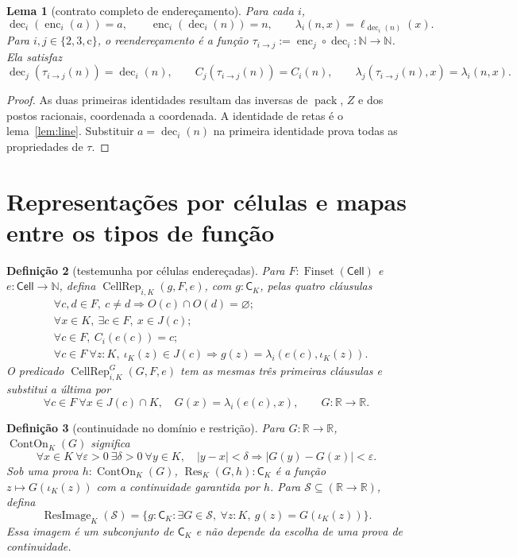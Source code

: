 \documentclass[11pt,a4paper]{article}
\newtheorem{definicao}{Definição}[section]
\newtheorem{lema}[definicao]{Lema}
\newcommand{\N}{\mathbb N}
\newcommand{\R}{\mathbb R}
\newcommand{\Cell}{\mathsf{Cell}}
\newcommand{\CK}{\mathsf C_K}
\newcommand{\FS}{\operatorname{Finset}}
\newcommand{\Res}{\operatorname{Res}}
\newcommand{\ImageRes}{\operatorname{ResImage}}
\newcommand{\dec}{\operatorname{dec}}
\newcommand{\enc}{\operatorname{enc}}
\begin{document}
\begin{lema}[contrato completo de endereçamento]\label{lem:codec}
Para cada $i$,
\[
 \dec_i(\enc_i(a))=a,\qquad \enc_i(\dec_i(n))=n,
 \qquad\lambda_i(n,x)=\ell_{\dec_i(n)}(x).
\]
Para $i,j\in\{2,3,\mathrm c\}$, o reendereçamento é a função
$\tau_{i\to j}:=\enc_j\circ\dec_i:\N\to\N$. Ela satisfaz
\[
 \dec_j(\tau_{i\to j}(n))=\dec_i(n),\qquad
 C_j(\tau_{i\to j}(n))=C_i(n),\qquad
 \lambda_j(\tau_{i\to j}(n),x)=\lambda_i(n,x).
\]
\end{lema}
\begin{proof}
As duas primeiras identidades resultam das inversas de
$\operatorname{pack}$, $Z$ e dos postos racionais, coordenada a
coordenada. A identidade de retas é o lema~\ref{lem:line}.
Substituir $a=\dec_i(n)$ na primeira identidade prova todas as
propriedades de $\tau$.
\end{proof}

\section{Representações por células e mapas entre os tipos de função}
\label{sec:bridge}

\begin{definicao}[testemunha por células endereçadas]\label{def:cellrep}
Para $F:\FS(\Cell)$ e $e:\Cell\to\N$, defina
$\operatorname{CellRep}_{i,K}(g,F,e)$, com $g:\CK$, pelas quatro
cláusulas
\begin{align*}
 &\forall c,d\in F,\ c\ne d\Rightarrow O(c)\cap O(d)=\varnothing;\\
 &\forall x\in K,\ \exists c\in F,\ x\in J(c);\\
 &\forall c\in F,\ C_i(e(c))=c;\\
 &\forall c\in F\ \forall z:K,\ \iota_K(z)\in J(c)
       \Rightarrow g(z)=\lambda_i(e(c),\iota_K(z)).
\end{align*}
O predicado $\operatorname{CellRep}^G_{i,K}(G,F,e)$ tem as mesmas
três primeiras cláusulas e substitui a última por
\[
 \forall c\in F\ \forall x\in J(c)\cap K,\quad
 G(x)=\lambda_i(e(c),x),\qquad G:\R\to\R.
\]
\end{definicao}

\begin{definicao}[continuidade no domínio e restrição]\label{def:restriction}
Para $G:\R\to\R$, $\operatorname{ContOn}_K(G)$ significa
\[
 \forall x\in K\ \forall\varepsilon>0\ \exists\delta>0\
 \forall y\in K,\quad |y-x|<\delta\Rightarrow
                         |G(y)-G(x)|<\varepsilon.
\]
Sob uma prova $h:\operatorname{ContOn}_K(G)$,
$\Res_K(G,h):\CK$ é a função $z\mapsto G(\iota_K(z))$ com a
continuidade garantida por $h$.
Para $\mathcal S\subseteq(\R\to\R)$, defina
\[
 \ImageRes_K(\mathcal S)=
 \{g:\CK:\exists G\in\mathcal S,\
             \forall z:K,\ g(z)=G(\iota_K(z))\}.
\]
Essa imagem é um subconjunto de $\CK$ e não depende da escolha
de uma prova de continuidade.
\end{definicao}
\end{document}
